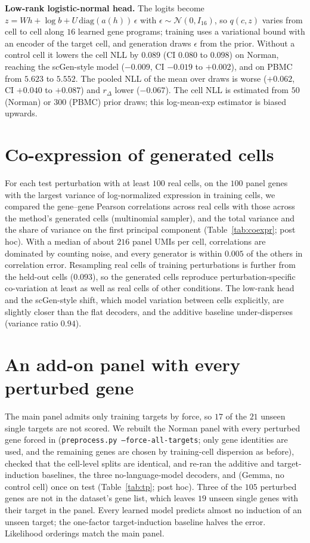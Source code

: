 \textbf{Low-rank logistic-normal head.} The logits become $z=Wh+\log b+U\,\mathrm{diag}(a(h))\,\epsilon$ with $\epsilon\sim\mathcal N(0,I_{16})$, so $q(c,z)$ varies from cell to cell along $16$ learned gene programs; training uses a variational bound with an encoder of the target cell, and generation draws $\epsilon$ from the prior. Without a control cell it lowers the cell NLL by $0.089$ (CI $0.080$ to $0.098$) on Norman, reaching the scGen-style model ($-0.009$, CI $-0.019$ to $+0.002$), and on PBMC from $5.623$ to $5.552$. The pooled NLL of the mean over draws is worse ($+0.062$, CI $+0.040$ to $+0.087$) and $r_\Delta$ lower ($-0.067$). The cell NLL is estimated from $50$ (Norman) or $300$ (PBMC) prior draws; this log-mean-exp estimator is biased upwards.

\FloatBarrier
\section{Co-expression of generated cells}\label{app:coexpr}
For each test perturbation with at least $100$ real cells, on the $100$ panel genes with the largest variance of log-normalized expression in training cells, we compared the gene--gene Pearson correlations across real cells with those across the method's generated cells (multinomial sampler), and the total variance and the share of variance on the first principal component (Table~\ref{tab:coexpr}; post hoc). With a median of about $216$ panel UMIs per cell, correlations are dominated by counting noise, and every generator is within $0.005$ of the others in correlation error. Resampling real cells of training perturbations is further from the held-out cells ($0.093$), so the generated cells reproduce perturbation-specific co-variation at least as well as real cells of other conditions. The low-rank head and the scGen-style shift, which model variation between cells explicitly, are slightly closer than the flat decoders, and the additive baseline under-disperses (variance ratio $0.94$).

\FloatBarrier
\section{An add-on panel with every perturbed gene}\label{app:tp}
The main panel admits only training targets by force, so $17$ of the $21$ unseen single targets are not scored. We rebuilt the Norman panel with every perturbed gene forced in (\texttt{preprocess.py --force-all-targets}; only gene identities are used, and the remaining genes are chosen by training-cell dispersion as before), checked that the cell-level splits are identical, and re-ran the additive and target-induction baselines, the three no-language-model decoders, and \cad{} (Gemma, no control cell) once on test (Table~\ref{tab:tp}; post hoc). Three of the $105$ perturbed genes are not in the dataset's gene list, which leaves $19$ unseen single genes with their target in the panel. Every learned model predicts almost no induction of an unseen target; the one-factor target-induction baseline halves the error. Likelihood orderings match the main panel.

